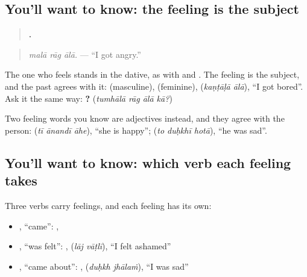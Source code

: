 \subsection*{You'll want to know: the feeling is the subject}
\begin{quote}
\textbf{  .}
\end{quote}

\begin{quote}
\emph{malā rāg ālā.} — \textquotedblleft{}I got angry.\textquotedblright{}
\end{quote}

The one who feels stands in the dative, as with \textbf{} and \textbf{}. The feeling is the subject, and the past agrees with it: \textbf{ } (masculine), \textbf{ } (feminine), \textbf{ } (\emph{kaṇṭāḷā ālā}), \textquotedblleft{}I got bored\textquotedblright{}. Ask it the same way: \textbf{   ?} (\emph{tumhālā rāg ālā kā?})

Two feeling words you know are adjectives instead, and they agree with the person: \textbf{  } (\emph{tī ānandī āhe}), \textquotedblleft{}she is happy\textquotedblright{}; \textbf{  } (\emph{to duḥkhī hotā}), \textquotedblleft{}he was sad\textquotedblright{}.

\subsection*{You'll want to know: which verb each feeling takes}
Three verbs carry feelings, and each feeling has its own:

\begin{itemize}
\raggedright
  \item \textbf{}, \textquotedblleft{}came\textquotedblright{}: \textbf{ }, \textbf{ }
  \item \textbf{}, \textquotedblleft{}was felt\textquotedblright{}: \textbf{ }, \textbf{ } (\emph{lāj vāṭlī}), \textquotedblleft{}I felt ashamed\textquotedblright{}
  \item \textbf{}, \textquotedblleft{}came about\textquotedblright{}: \textbf{ }, \textbf{ } (\emph{duḥkh jhālaṁ}), \textquotedblleft{}I was sad\textquotedblright{}
\end{itemize}

